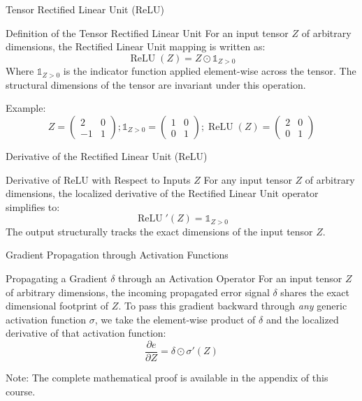 \begin{frame}{Tensor Rectified Linear Unit (ReLU)}
	\begin{block}{Definition of the Tensor Rectified Linear Unit}
		For an input tensor $Z$ of arbitrary dimensions, the Rectified Linear Unit mapping is written as:
		\begin{equation*}
			\operatorname{ReLU}(Z) = Z \odot \mathbb{1}_{Z > 0}
		\end{equation*}
		Where $\mathbb{1}_{Z > 0}$ is the indicator function applied element-wise across the tensor. The structural dimensions of the tensor are invariant under this operation.
	\end{block}
	\pause
	Example:
	\begin{equation*}
		Z = \begin{pmatrix}
			2 & 0 \\
			-1 & 1 
		\end{pmatrix}; 
		\mathbb{1}_{Z > 0} = \begin{pmatrix}
			1 & 0 \\
			0 & 1 
		\end{pmatrix};
		\operatorname{ReLU}(Z) = \begin{pmatrix}
			2 & 0 \\
			0 & 1 
		\end{pmatrix}
	\end{equation*}
\end{frame}

\begin{frame}{Derivative of the Rectified Linear Unit (ReLU)}
	\begin{block}{Derivative of ReLU with Respect to Inputs $Z$}
		For any input tensor $Z$ of arbitrary dimensions, the localized derivative of the Rectified Linear Unit operator simplifies to:
		\begin{equation*}
			\operatorname{ReLU}'(Z) = \mathbb{1}_{Z > 0}
		\end{equation*}
		The output structurally tracks the exact dimensions of the input tensor $Z$.		
	\end{block}	
\end{frame}

\begin{frame}{Gradient Propagation through Activation Functions}
	\begin{block}{Propagating a Gradient $\delta$ through an Activation Operator}
		For an input tensor $Z$ of arbitrary dimensions, the incoming propagated error signal $\delta$ shares the exact dimensional footprint of $Z$. To pass this gradient backward through \textit{any} generic activation function $\sigma$, we take the element-wise product of $\delta$ and the localized derivative of that activation function:
		\begin{equation*}
			\frac{\partial{e}}{\partial{Z}} = \delta \odot \sigma'(Z)
		\end{equation*}
	\end{block}
	Note: The complete mathematical proof is available in the appendix of this course.
\end{frame}

